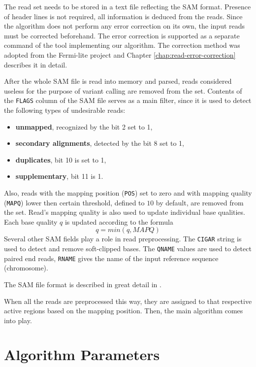 The read set needs to be stored in a text file reflecting the SAM format. Presence of header lines is not required, all information is deduced from the reads. Since the algorithm does not perform any error correction on its own, the input reads must be corrected beforehand. The error correction is supported as a separate command of the tool implementing our algorithm. The correction method was adopted from the Fermi-lite\cite{fermi-lite} project and Chapter \ref{chap:read-error-correction} describes it in detail.

After the whole SAM file is read into memory and parsed, reads considered useless for the purpose of variant calling are removed from the set. Contents of the \texttt{FLAGS} column of the SAM file serves as a main filter, since it is used to detect the following types of undesirable reads:
\begin{itemize}
\item \textbf{unmapped}, recognized by the bit 2 set to 1,
\item \textbf{secondary alignments}, detected by the bit 8 set to 1,
\item \textbf{duplicates}, bit 10 is set to 1,
\item \textbf{supplementary}, bit 11 is 1.
\end{itemize}

Also, reads with the mapping position (\texttt{POS}) set to zero and with mapping quality (\texttt{MAPQ}) lower then certain threshold, defined to $10$ by default, are removed from the set. Read's mapping quality is also used to update individual base qualities. Each base quality $q$ is updated according to the formula
$$
q = min(q, MAPQ)
$$
Several other SAM fields play a role in read preprocessing. The \texttt{CIGAR} string is used to detect and remove soft-clipped bases. The \texttt{QNAME} values are used to detect paired end reads, \texttt{RNAME} gives the name of the input reference sequence (chromosome).

The SAM file format is described in great detail in \cite{sambam}.

When all the reads are preprocessed this way, they are assigned to that respective active regions based on the mapping position. Then, the main algorithm comes into play.

\section{Algorithm Parameters}
\label{sec:algorithm-parameters}

